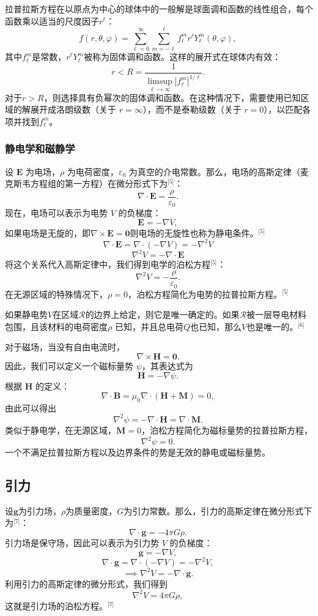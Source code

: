 拉普拉斯方程在以原点为中心的球体中的一般解是球面调和函数的线性组合，每个函数乘以适当的尺度因子\( r^\ell \)：
\[
f(r, \theta, \varphi) = \sum_{\ell = 0}^{\infty} \sum_{m = -\ell}^{\ell} f_{\ell}^m r^\ell Y_{\ell}^m(\theta, \varphi),~
\]
其中\( f_{\ell}^m \)是常数，\( r^\ell Y_{\ell}^m \)被称为固体调和函数。这样的展开式在球体内有效：
\[
r < R = \frac{1}{\limsup_{\ell \to \infty} |f_{\ell}^m|^{1/\ell}}.~
\]
对于\( r > R \)，则选择具有负幂次的固体调和函数。在这种情况下，需要使用已知区域的解展开成洛朗级数（关于 \( r = \infty \)），而不是泰勒级数（关于 \( r = 0 \)），以匹配各项并找到\( f_{\ell}^m \)。
\subsubsection{静电学和磁静学}  
设 \( \mathbf{E} \) 为电场，\( \rho \) 为电荷密度，\( \varepsilon_0 \) 为真空的介电常数。那么，电场的高斯定律（麦克斯韦方程组的第一方程）在微分形式下为\(^\text{[5]}\)：
\[
\nabla \cdot \mathbf{E} = \frac{\rho}{\varepsilon_0}.~
\]
现在，电场可以表示为电势 \( V \) 的负梯度：
\[
\mathbf{E} = -\nabla V,~
\]
如果电场是无旋的，即\(\nabla \times \mathbf{E} = \mathbf{0}\)则电场的无旋性也称为静电条件。\(^\text{[5]}\)
\[
\nabla \cdot \mathbf{E} = \nabla \cdot (-\nabla V) = -\nabla^2 V~
\]
\[
\nabla^2 V = -\nabla \cdot \mathbf{E}~
\]
将这个关系代入高斯定律中，我们得到电学的泊松方程\(^\text{[5]}\)：
\[
\nabla^2 V = -\frac{\rho}{\varepsilon_0}.~
\]
在无源区域的特殊情况下，\( \rho = 0 \)，泊松方程简化为电势的拉普拉斯方程。\(^\text{[5]}\)

如果静电势\( V \)在区域\( \mathcal{R} \)的边界上给定，则它是唯一确定的。如果\( \mathcal{R} \)被一层导电材料包围，且该材料的电荷密度\( \rho \) 已知，并且总电荷\( Q \)也已知，那么\( V \)也是唯一的。\(^\text{[6]}\)

对于磁场，当没有自由电流时，
\[
\nabla \times \mathbf{H} = \mathbf{0}.~
\]
因此，我们可以定义一个磁标量势 \( \psi \)，其表达式为
\[
\mathbf{H} = -\nabla \psi.~
\]
根据 \( \mathbf{H} \) 的定义：
\[
\nabla \cdot \mathbf{B} = \mu_0 \nabla \cdot (\mathbf{H} + \mathbf{M}) = 0,~
\]
由此可以得出
\[
\nabla^2 \psi = -\nabla \cdot \mathbf{H} = \nabla \cdot \mathbf{M}.~
\]
类似于静电学，在无源区域，\( \mathbf{M} = 0 \)，泊松方程简化为磁标量势的拉普拉斯方程，
\[
\nabla^2 \psi = 0.~
\]
一个不满足拉普拉斯方程以及边界条件的势是无效的静电或磁标量势。
\subsection{引力}  
设\( \mathbf{g} \)为引力场，\( \rho \)为质量密度，\( G \)为引力常数。那么，引力的高斯定律在微分形式下为\(^\text{[7]}\)：
\[
\nabla \cdot \mathbf{g} = -4\pi G \rho.~
\]
引力场是保守场，因此可以表示为引力势 \( V \) 的负梯度：
\[
\mathbf{g} = -\nabla V,~
\]
\[
\nabla \cdot \mathbf{g} = \nabla \cdot (-\nabla V) = -\nabla^2 V,~
\]
\[
\implies \nabla^2 V = -\nabla \cdot \mathbf{g}.~
\]
利用引力的高斯定律的微分形式，我们得到
\[
\nabla^2 V = 4\pi G \rho,~
\]
这就是引力场的泊松方程。\(^\text{[7]}\)

